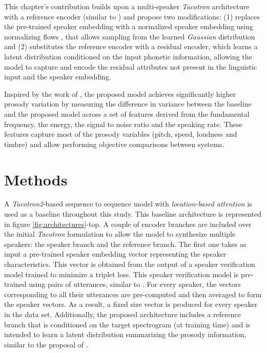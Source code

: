 This chapter's contribution builds upon a multi-speaker \textit{Tacotron} architecture with a reference encoder (similar to \autocite{skerryryan2018}) and propose two modifications: (1) replaces the pre-trained speaker embedding with a normalized speaker embedding using normalizing flows \autocite{kingma2018}, that allows sampling from the learned \textit{Gaussian} distribution and (2)  substitutes the reference encoder with a residual encoder, which learns a latent distribution conditioned on the input phonetic information, allowing the model to capture and encode the residual attributes not present in the linguistic input and the speaker embedding.

Inspired by the work of \autocite{Raitio2020}, the proposed model achieves significantly higher prosody variation by measuring the difference in variance between the baseline and the proposed model across a set of features derived from the fundamental frequency, the energy, the signal to noise ratio and the speaking rate. These features capture most of the prosody variables (pitch, speed, loudness and timbre) \autocite{Raitio2020} and allow performing objective comparisons between systems.


\section{Methods}
A \textit{Tacotron2}-based sequence to sequence model with \textit{location-based attention} \autocite{Wang2017} is used as a baseline throughout this study. This baseline architecture is represented in figure \ref{fig:architectures}-top. A couple of encoder branches are included over the initial \textit{Tacotron} formulation to allow the model to synthesize multiple speakers: the speaker branch and the reference branch. The first one takes as input a pre-trained speaker embedding vector representing the speaker characteristics. This vector is obtained from the output of a speaker verification model trained to minimize a triplet loss. This speaker verification model is pre-trained using pairs of utterances, similar to  \autocite{Ren2019}. For every speaker, the vectors corresponding to all their utterances are pre-computed and then averaged to form the speaker vectors. As a result, a fixed size vector is produced for every speaker in the data set. Additionally, the proposed architecture includes a reference branch that is conditioned on the target spectrogram (at training time) and is intended to learn a latent distribution summarizing the prosody information, similar to the proposal of \autocite{skerryryan2018}.

